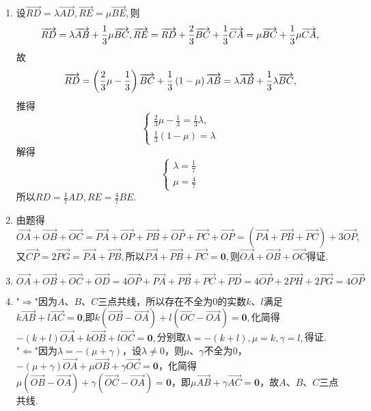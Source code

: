\documentclass[UTF8]{ctexart}
\begin{document}
\begin{enumerate}
\item 设$\overrightarrow{RD}=\lambda\overrightarrow{AD},\overrightarrow{RE}=\mu\overrightarrow{BE},$则$$\overrightarrow{RD}=\lambda\overrightarrow{AB}+\displaystyle\frac{1}{3}\mu\\ \overrightarrow{BC},\overrightarrow{RE}=\overrightarrow{RD}+\displaystyle\frac{2}{3}\overrightarrow{BC}+\displaystyle\frac{1}{3}\overrightarrow{CA}=\mu \overrightarrow{BC}+\displaystyle\frac{1}{3}\mu \overrightarrow{CA},$$故$$\overrightarrow{RD}=\left(\displaystyle\frac{2}{3}\mu-\displaystyle\frac{1}{3}\right)\overrightarrow{BC}+\displaystyle\frac{1}{3}\left(1-\mu\right)\overrightarrow{AB}=\lambda\overrightarrow{AB}+\displaystyle\frac{1}{3}\lambda\\\overrightarrow{BC},$$推得$$\left\{\begin{array}{ll}\displaystyle\frac{2}{3}\mu-\displaystyle\frac{1}{3}=\displaystyle\frac{1}{3}\lambda,\\ \displaystyle\frac{1}{3}\left(1-\mu\right)=\lambda\end{array}\right.$$解得$$\left\{\begin{array}{ll}\lambda=\displaystyle\frac{1}{7}\\ \mu=\displaystyle\frac{4}{7}\end{array}\right. $$所以$RD=\displaystyle\frac{1}{7}AD,RE=\displaystyle\frac{4}{7}BE$.

\item 由题得$$\overrightarrow{OA}+\overrightarrow{OB}+\overrightarrow{OC}=\overrightarrow{PA}+\overrightarrow{OP}+\overrightarrow{PB}+\overrightarrow{OP}+\overrightarrow{PC}+\overrightarrow{OP}=\left(\overrightarrow{PA}+\overrightarrow{PB}+\overrightarrow{PC}\right)+3\overrightarrow{OP},$$又$\overrightarrow{CP}=2\overrightarrow{PG}=\overrightarrow{PA}+\overrightarrow{PB},$所以$\overrightarrow{PA}+\overrightarrow{PB}+\overrightarrow{PC}=\mathbf{0},$则$\overrightarrow{OA}+\overrightarrow{OB}+\overrightarrow{OC}$得证. 

\item $\overrightarrow{OA}+\overrightarrow{OB}+\overrightarrow{OC}+\overrightarrow{OD}=4\overrightarrow{OP}+\overrightarrow{PA}+\overrightarrow{PB}+\overrightarrow{PC}+\overrightarrow{PD}=4\overrightarrow{OP}+2\overrightarrow{PH}+2\overrightarrow{PG}=4\overrightarrow{OP}$

\item "$\Rightarrow$"因为$A$、$B$、$C$三点共线，所以存在不全为$0$的实数$k$、$l$满足$k\overrightarrow{AB}+l\overrightarrow{AC}=\mathbf{0}$,即$k\left(\overrightarrow{OB}-\overrightarrow{OA}\right)+l\left(\overrightarrow{OC}-\overrightarrow{OA}\right)=\mathbf{0},$化简得$-\left(k+l\right)\overrightarrow{OA}+k\overrightarrow{OB}+l\overrightarrow{OC}=\mathbf{0},$分别取$\lambda=-\left(k+l\right),\mu=k,\gamma=l,$得证.\\
"$\Leftarrow$"因为$\lambda=-\left(\mu+\gamma\right)$，设$\lambda\neq0$，则$\mu$、$\gamma$不全为$0$，$-\left(\mu+\gamma\right)\overrightarrow{OA}+\mu\overrightarrow{OB}+\gamma\overrightarrow{OC}=\mathbf{0}$，化简得$\mu\left(\overrightarrow{OB}-\overrightarrow{OA}\right)+\gamma\left(\overrightarrow{OC}-\overrightarrow{OA}\right)=\mathbf{0}$，即$\mu\overrightarrow{AB}+\gamma\overrightarrow{AC}=\mathbf{0}$，故$A$、$B$、$C$三点共线. 


\end{enumerate}
\end{document}
